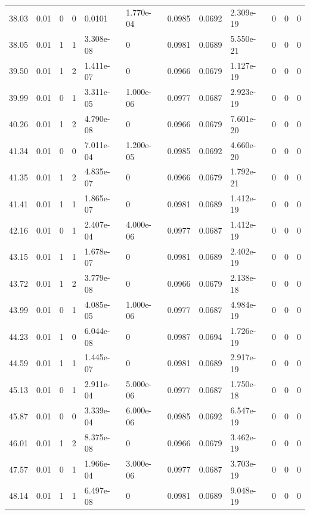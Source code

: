 \documentclass[preview]{standalone}
\begin{document}
{{{\begin{tabular}{L{1.2cm}C{1.2cm} C{0.3cm}C{0.5cm} C{1.4cm}C{1.4cm} C{1.4cm}C{1.4cm} C{1.6cm}C{1.6cm} C{1.6cm}C{1.6cm}}
  38.03  &  0.01  & 0     &  0 &  0.0101  & 1.770e-04  &  0.0985&   0.0692& 2.309e-19 & 0   &  0 & 0  \\ 
  38.05  &  0.01  & 1     &  1 &  3.308e-08  & 0  &  0.0981&   0.0689& 5.550e-21 & 0   &  0 & 0  \\ 
  39.50  &  0.01  & 1     &  2 &  1.411e-07  & 0  &  0.0966&   0.0679& 1.127e-19 & 0   &  0 & 0  \\ 
  39.99  &  0.01  & 0     &  1 &  3.311e-05  & 1.000e-06  &  0.0977&   0.0687& 2.923e-19 & 0   &  0 & 0  \\ 
  40.26  &  0.01  & 1     &  2 &  4.790e-08  & 0  &  0.0966&   0.0679& 7.601e-20 & 0   &  0 & 0  \\ 
  41.34  &  0.01  & 0     &  0 &  7.011e-04  & 1.200e-05  &  0.0985&   0.0692& 4.660e-20 & 0   &  0 & 0  \\ 
  41.35  &  0.01  & 1     &  2 &  4.835e-07  & 0  &  0.0966&   0.0679& 1.792e-21 & 0   &  0 & 0  \\ 
  41.41  &  0.01  & 1     &  1 &  1.865e-07  & 0  &  0.0981&   0.0689& 1.412e-19 & 0   &  0 & 0  \\ 
  42.16  &  0.01  & 0     &  1 &  2.407e-04  & 4.000e-06  &  0.0977&   0.0687& 1.412e-19 & 0   &  0 & 0  \\ 
  43.15  &  0.01  & 1     &  1 &  1.678e-07  & 0  &  0.0981&   0.0689& 2.402e-19 & 0   &  0 & 0  \\ 
  43.72  &  0.01  & 1     &  2 &  3.779e-08  & 0  &  0.0966&   0.0679& 2.138e-18 & 0   &  0 & 0  \\ 
  43.99  &  0.01  & 0     &  1 &  4.085e-05  & 1.000e-06  &  0.0977&   0.0687& 4.984e-19 & 0   &  0 & 0  \\ 
  44.23  &  0.01  & 1     &  0 &  6.044e-08  & 0  &  0.0987&   0.0694& 1.726e-19 & 0   &  0 & 0  \\ 
  44.59  &  0.01  & 1     &  1 &  1.445e-07  & 0  &  0.0981&   0.0689& 2.917e-19 & 0   &  0 & 0  \\ 
  45.13  &  0.01  & 0     &  1 &  2.911e-04  & 5.000e-06  &  0.0977&   0.0687& 1.750e-18 & 0   &  0 & 0  \\ 
  45.87  &  0.01  & 0     &  0 &  3.339e-04  & 6.000e-06  &  0.0985&   0.0692& 6.547e-19 & 0   &  0 & 0  \\ 
  46.01  &  0.01  & 1     &  2 &  8.375e-08  & 0  &  0.0966&   0.0679& 3.462e-19 & 0   &  0 & 0  \\ 
  47.57  &  0.01  & 0     &  1 &  1.966e-04  & 3.000e-06  &  0.0977&   0.0687& 3.703e-19 & 0   &  0 & 0  \\ 
  48.14  &  0.01  & 1     &  1 &  6.497e-08  & 0  &  0.0981&   0.0689& 9.048e-19 & 0   &  0 & 0  \\ 

\end{tabular}}}}
\end{document}
